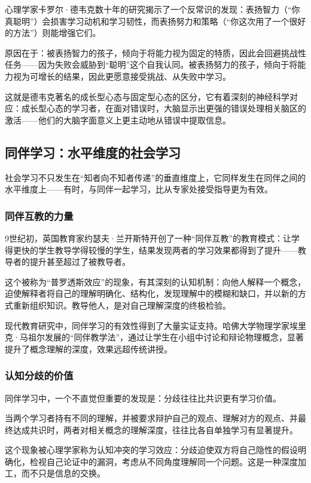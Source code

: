 \documentclass[11pt]{article}
\begin{document}
心理学家卡罗尔·德韦克数十年的研究揭示了一个反常识的发现：表扬智力（“你真聪明”）会损害学习动机和学习韧性，而表扬努力和策略（“你这次用了一个很好的方法”）则能增强它们。

原因在于：被表扬智力的孩子，倾向于将能力视为固定的特质，因此会回避挑战性任务——因为失败会威胁到“聪明”这个自我认同。被表扬努力的孩子，倾向于将能力视为可增长的结果，因此更愿意接受挑战、从失败中学习。

这就是德韦克著名的成长型心态与固定型心态的区分，它有着深刻的神经科学对应：成长型心态的学习者，在面对错误时，大脑显示出更强的错误处理相关脑区的激活——他们的大脑字面意义上更主动地从错误中提取信息。
\subsection{同伴学习：水平维度的社会学习}
\label{sec:orgf2eb96c}

社会学习不只发生在“知者向不知者传递”的垂直维度上，它同样发生在同伴之间的水平维度上——有时，与同伴一起学习，比从专家处接受指导更为有效。
\subsubsection{同伴互教的力量}
\label{sec:orgaec0123}

9世纪初，英国教育家约瑟夫·兰开斯特开创了一种“同伴互教”的教育模式：让学得更快的学生教导学得较慢的学生，结果发现两者的学习效果都得到了提升——教导者的提升甚至超过了被教导者。

这个被称为“普罗透斯效应”的现象，有其深刻的认知机制：向他人解释一个概念，迫使解释者将自己的理解明确化、结构化，发现理解中的模糊和缺口，并以新的方式重新组织知识。教导他人，是对自己理解深度的终极检验。

现代教育研究中，同伴学习的有效性得到了大量实证支持。哈佛大学物理学家埃里克·马祖尔发展的“同伴教学法”，通过让学生在小组中讨论和辩论物理概念，显著提升了概念理解的深度，效果远超传统讲授。
\subsubsection{认知分歧的价值}
\label{sec:org43897a4}

同伴学习中，一个不直觉但重要的发现是：分歧往往比共识更有学习价值。

当两个学习者持有不同的理解，并被要求辩护自己的观点、理解对方的观点、并最终达成共识时，两者对相关概念的理解深度，往往比各自单独学习有显著提升。

这个现象被心理学家称为认知冲突的学习效应：分歧迫使双方将自己隐性的假设明确化，检视自己论证中的漏洞，考虑从不同角度理解同一个问题。这是一种深度加工，而不只是信息的交换。
\end{document}

